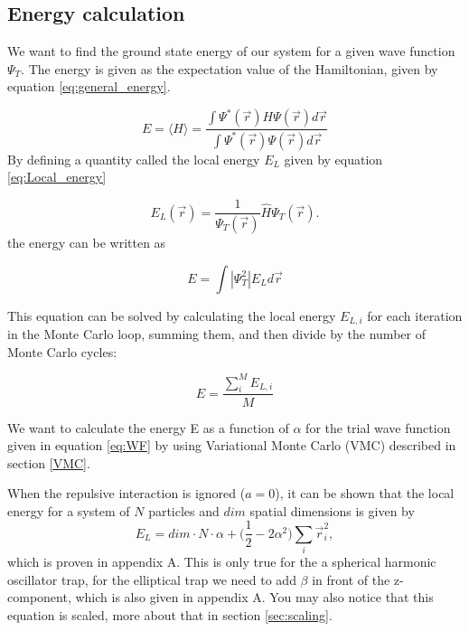 \documentclass[norsk,a4paper,12pt]{article}
\begin{document}
\subsection{Energy calculation}

We want to find the ground state energy of our system for a given wave function $\Psi_T$. The energy is given as the expectation value of the Hamiltonian, given by equation \ref{eq:general_energy}. 

\begin{equation}
E=\langle H\rangle = \frac{\int\Psi^*(\vec{r})H\Psi(\vec{r})d\vec{r}}{\int\Psi^*(\vec{r})\Psi(\vec{r})d\vec{r}}
\label{eq:general_energy}
\end{equation}
By defining a quantity called the local energy $E_L$ given by equation \ref{eq:Local_energy}

\begin{equation}
E_L(\vec{r})=\frac{1}{\Psi_T(\vec{r})}\hat{H}\Psi_T(\vec{r}).
\label{eq:Local_energy}
\end{equation}
the energy can be written as

\begin{equation}
	E = \int | \Psi_T^2| E_L d\vec{r}
\end{equation}

This equation can be solved by calculating the local energy $E_{L,i}$ for each iteration in the Monte Carlo loop, summing them, and then divide by the number of Monte Carlo cycles:

\begin{equation}
	E = \frac{\sum_i^M E_{L,i}}{M}
\end{equation}

 We want to calculate the energy E as a function of $\alpha$ for the trial wave function given in equation \ref{eq:WF} by using Variational Monte Carlo (VMC) described in section \ref{VMC}. 

When the repulsive interaction is ignored ($a=0$), it can be shown that the local energy for a system of $N$ particles and $dim$ spatial dimensions is given by
\begin{equation}
E_L=dim\cdot N\cdot \alpha + \Big(\frac{1}{2}-2\alpha^2\Big)\sum_i\vec{r}_i^2,
\end{equation}
which is proven in appendix A. This is only true for the a spherical harmonic oscillator trap, for the elliptical trap we need to add $\beta$ in front of the z-component, which is also given in appendix A. You may also notice that this equation is scaled, more about that in section \ref{sec:scaling}.
\end{document}
